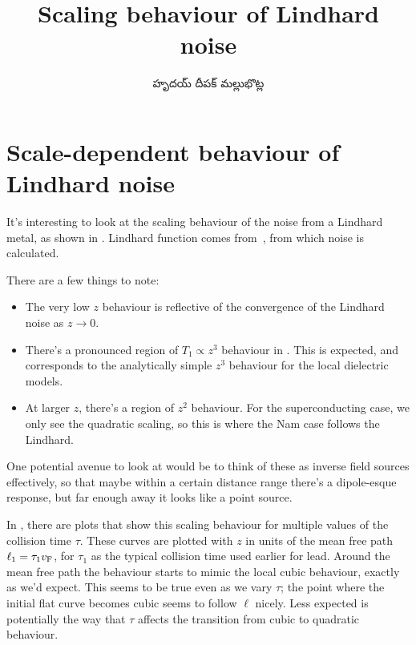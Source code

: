 \documentclass[../main.tex]{subfiles}
\title{Scaling behaviour of Lindhard noise}
\author{\begin{telugu}హృదయ్ దీపక్ మల్లుభొట్ల\end{telugu}}
\date{}
\begin{document}
	\graphicspath{{\main/figures/}}

	\onlyinsubfile{\maketitle}

	\section{Scale-dependent behaviour of Lindhard noise} \label{sec:lsb:intro}

	It's interesting to look at the scaling behaviour of the noise from a Lindhard metal, as shown in .
	Lindhard function comes from~\cite{SolyomV3}, from which noise is calculated.

	There are a few things to note:
	\begin{itemize}
		\item The very low $z$ behaviour is reflective of the convergence of the Lindhard noise as $z \rightarrow 0$.
		\item There's a pronounced region of $T_1 \propto z^3$ behaviour in .
			This is expected, and corresponds to the analytically simple $z^3$ behaviour for the local dielectric models.
		\item At larger $z$, there's a region of $z^2$ behaviour.
			For the superconducting case, we only see the quadratic scaling, so this is where the Nam case follows the Lindhard.
	\end{itemize}

	One potential avenue to look at would be to think of these as inverse field sources effectively, so that maybe within a certain distance range there's a dipole-esque response, but far enough away it looks like a point source.

	In , there are plots that show this scaling behaviour for multiple values of the collision time $\tau$.
	These curves are plotted with $z$ in units of the mean free path $\ell_1 = \tau_1 v_{\mathrm{F}}$, for $\tau_1$ as the typical collision time used earlier for lead.
	Around the mean free path the behaviour starts to mimic the local cubic behaviour, exactly as we'd expect.
	This seems to be true even as we vary $\tau$;
	the point where the initial flat curve becomes cubic seems to follow $\ell$ nicely.
	Less expected is potentially the way that $\tau$ affects the transition from cubic to quadratic behaviour. 
\end{document}
